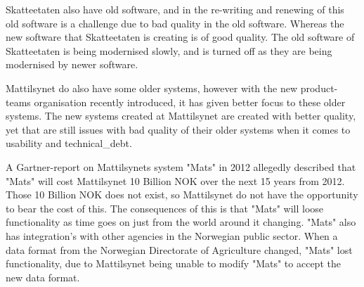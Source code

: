 Skatteetaten also have old software, and in the re-writing and renewing of this old software is a challenge due to bad quality in the old software. Whereas the new software that Skatteetaten is creating is of good quality. The old software of Skatteetaten is being modernised slowly, and is turned off as they are being modernised by newer software.

Mattilsynet do also have some older systems, however with the new product-teams organisation recently introduced, it has given better focus to these older systems. The new systems created at Mattilsynet are created with better quality, yet that are still issues with bad quality of their older systems when it comes to usability and \gls{technical_debt}.

A Gartner-report on Mattilsynets system "Mats" in 2012 allegedly described that "Mats" will cost Mattilsynet 10 Billion NOK over the next 15 years from 2012. Those 10 Billion NOK does not exist, so Mattilsynet do not have the opportunity to bear the cost of this. The consequences of this is that "Mats" will loose functionality as time goes on just from the world around it changing. "Mats" also has integration's with other agencies in the Norwegian public sector. When a data format from the Norwegian Directorate of Agriculture changed, "Mats" lost functionality, due to Mattilsynet being unable to modify "Mats" to accept the new data format.




